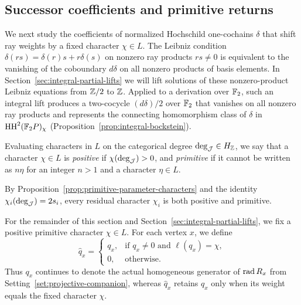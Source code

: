 \subsection{Successor coefficients and primitive returns}
\label{sec:primitive-ray-equations}

We next study the coefficients of normalized Hochschild one-cochains $\delta$ that shift ray weights by a fixed character $\chi\in L$. The Leibniz condition $\delta(rs)=\delta(r)s+r\delta(s)$ on nonzero ray products $rs\ne0$ is equivalent to the vanishing of the coboundary $d\delta$ on all nonzero products of basis elements. In Section~\ref{sec:integral-partial-lifts} we will lift solutions of these nonzero-product Leibniz equations from $\mathbb Z/2$ to $\mathbb Z$. Applied to a derivation over $\mathbb F_2$, such an integral lift produces a two-cocycle $(d\delta)/2$ over $\mathbb F_2$ that vanishes on all nonzero ray products and represents the connecting homomorphism class of $\delta$ in $\operatorname{HH}^2(\mathbb F_2P)_\chi$ (Proposition~\ref{prop:integral-bockstein}).

\begin{definition}
\label{def:primitive-characters}
Evaluating characters in $L$ on the categorical degree $\deg_\mathcal J\in H_\mathbb Z$, we say that a character $\chi\in L$ is \emph{positive} if $\chi(\deg_\mathcal J)>0$, and \emph{primitive} if it cannot be written as $n\eta$ for an integer $n>1$ and a character $\eta\in L$.
\end{definition}

By Proposition~\ref{prop:primitive-parameter-characters} and the identity $\chi_i(\deg_\mathcal J)=2s_i$, every residual character $\chi_i$ is both positive and primitive.

\begin{setting}
\label{set:fixed-character}
For the remainder of this section and Section~\ref{sec:integral-partial-lifts}, we fix a positive primitive character $\chi\in L$. For each vertex $x$, we define
\[
  \widehat q_x=\begin{cases}
  q_x, & \text{if }q_x\ne0\text{ and }\ell(q_x)=\chi,\\
  0, & \text{otherwise}.
  \end{cases}
\]
Thus $q_x$ continues to denote the actual homogeneous generator of $\operatorname{rad} R_x$ from Setting~\ref{set:projective-companion}, whereas $\widehat q_x$ retains $q_x$ only when its weight equals the fixed character $\chi$.
\end{setting}

